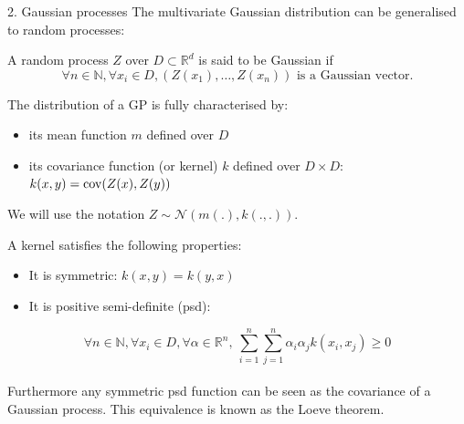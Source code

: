 
\begin{frame}{2. Gaussian processes}
The multivariate Gaussian distribution can be generalised to random processes:
\begin{definition}
A random process $Z$ over $D \subset \mathds{R}^d$ is said to be Gaussian if
\begin{equation*}
\forall n \in \mathds{N}, \forall x_i \in D, (Z(x_1),\dots,Z(x_n)) \text{  is a Gaussian vector}.
\end{equation*}
\end{definition}
The distribution of a GP is fully characterised by:
\begin{itemize}
	\item its mean function $m$ defined over $D$
	\item its covariance function (or kernel) $k$ defined over $D \times D$: $k(x,y) = \operatorname*{cov}(Z(x),Z(y))$
\end{itemize}
We will use the notation $Z \sim \mathcal{N}(m(.),k(.,.))$.
\end{frame}

\begin{frame}{}
A kernel satisfies the following properties:
\begin{itemize}
	\item It is symmetric: $k(x,y) = k(y,x)$
	\item It is positive semi-definite (psd):
\end{itemize}
\begin{equation*}
	\forall n \in \mathds{N}, \forall x_i \in D, \forall \alpha \in \mathds{R}^n,\  \sum_{i=1}^n \sum_{j=1}^n \alpha_i \alpha_j k(x_i,x_j) \geq 0
\end{equation*}
\vspace{5mm} \\
Furthermore any symmetric psd function can be seen as the covariance of a Gaussian process. This equivalence is known as the Loeve theorem.
\end{frame}

